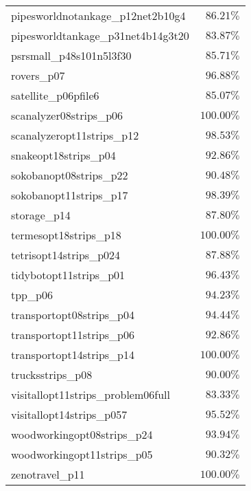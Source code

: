 \begin{tabular}{lr}
pipesworldnotankage\_p12net2b10g4 & $86.21\%$ \\
pipesworldtankage\_p31net4b14g3t20 & $83.87\%$ \\
psrsmall\_p48s101n5l3f30 & $85.71\%$ \\
rovers\_p07 & $96.88\%$ \\
satellite\_p06pfile6 & $85.07\%$ \\
scanalyzer08strips\_p06 & $100.00\%$ \\
scanalyzeropt11strips\_p12 & $98.53\%$ \\
snakeopt18strips\_p04 & $92.86\%$ \\
sokobanopt08strips\_p22 & $90.48\%$ \\
sokobanopt11strips\_p17 & $98.39\%$ \\
storage\_p14 & $87.80\%$ \\
termesopt18strips\_p18 & $100.00\%$ \\
tetrisopt14strips\_p024 & $87.88\%$ \\
tidybotopt11strips\_p01 & $96.43\%$ \\
tpp\_p06 & $94.23\%$ \\
transportopt08strips\_p04 & $94.44\%$ \\
transportopt11strips\_p06 & $92.86\%$ \\
transportopt14strips\_p14 & $100.00\%$ \\
trucksstrips\_p08 & $90.00\%$ \\
visitallopt11strips\_problem06full & $83.33\%$ \\
visitallopt14strips\_p057 & $95.52\%$ \\
woodworkingopt08strips\_p24 & $93.94\%$ \\
woodworkingopt11strips\_p05 & $90.32\%$ \\
zenotravel\_p11 & $100.00\%$ \\
\bottomrule
\end{tabular}
